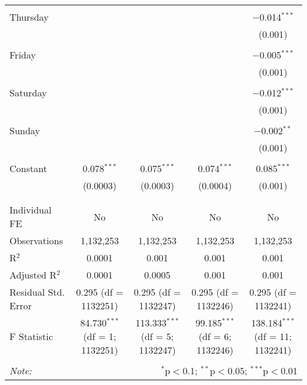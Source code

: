 \documentclass[
]{article}
\begin{document}
\begin{table}[!htbp]
{\begin{tabular}{@{\extracolsep{5pt}}lcccc}
  & & & & \\ 
 Thursday &  &  &  & $-$0.014$^{***}$ \\ 
  &  &  &  & (0.001) \\ 
  & & & & \\ 
 Friday &  &  &  & $-$0.005$^{***}$ \\ 
  &  &  &  & (0.001) \\ 
  & & & & \\ 
 Saturday &  &  &  & $-$0.012$^{***}$ \\ 
  &  &  &  & (0.001) \\ 
  & & & & \\ 
 Sunday &  &  &  & $-$0.002$^{**}$ \\ 
  &  &  &  & (0.001) \\ 
  & & & & \\ 
 Constant & 0.078$^{***}$ & 0.075$^{***}$ & 0.074$^{***}$ & 0.085$^{***}$ \\ 
  & (0.0003) & (0.0003) & (0.0004) & (0.001) \\ 
  & & & & \\ 
\hline \\[-1.8ex] 
Individual FE & No & No & No & No \\ 
Observations & 1,132,253 & 1,132,253 & 1,132,253 & 1,132,253 \\ 
R$^{2}$ & 0.0001 & 0.001 & 0.001 & 0.001 \\ 
Adjusted R$^{2}$ & 0.0001 & 0.0005 & 0.001 & 0.001 \\ 
Residual Std. Error & 0.295 (df = 1132251) & 0.295 (df = 1132247) & 0.295 (df = 1132246) & 0.295 (df = 1132241) \\ 
F Statistic & 84.730$^{***}$ (df = 1; 1132251) & 113.333$^{***}$ (df = 5; 1132247) & 99.185$^{***}$ (df = 6; 1132246) & 138.184$^{***}$ (df = 11; 1132241) \\ 
\hline 
\hline \\[-1.8ex] 
\textit{Note:}  & \multicolumn{4}{r}{$^{*}$p$<$0.1; $^{**}$p$<$0.05; $^{***}$p$<$0.01} \\ 
\end{tabular}
} 
\end{table} 
\newpage
\end{document}
